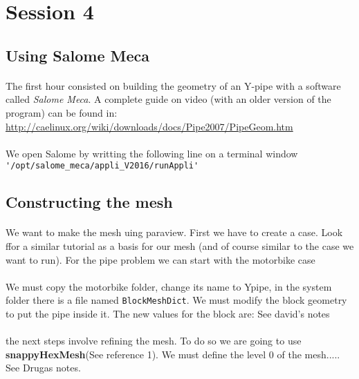 

\section{Session 4}


\subsection{Using Salome Meca}
\paragraph{}The first hour consisted on building the geometry of an \textsf{Y-pipe} with a software called \emph{Salome Meca}. A complete guide on video (with an older version of the program) can be found in:\\
\url{http://caelinux.org/wiki/downloads/docs/Pipe2007/PipeGeom.htm}
\paragraph{}We open Salome by writting the following line on a terminal window\\
\lstinline!'/opt/salome_meca/appli_V2016/runAppli'!
\subsection{Constructing the mesh}
\paragraph{}We want to make the mesh uing paraview. First we have to create a case. Look ffor a similar tutorial as a basis for our mesh (and of course similar to the case we want to run). For the pipe problem we can start with the motorbike case

\paragraph{}
We must copy the motorbike folder, change its name to Ypipe, in the system folder there is a file named \texttt{BlockMeshDict}. We must modify the block geometry to put the pipe inside it. The new values for the block are:
See david's notes

\paragraph{}the next steps involve refining the mesh. To do so we are going to use \textbf{snappyHexMesh}(See reference 1). We must define the level 0 of the mesh..... See Drugas notes.

